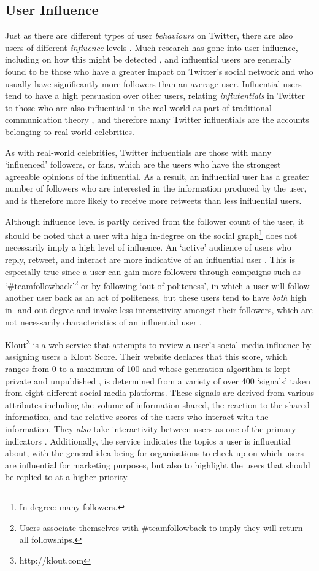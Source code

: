 \subsection{User Influence}
Just as there are different types of user \textit{behaviours} on Twitter, there are also users of different \textit{influence} levels \cite{quercia11}. Much research has gone into user influence, including on how this might be detected \cite{yu11}, and influential users are generally found to be those who have a greater impact on Twitter's social network \cite{bakshy11} and who usually have significantly more followers than an average user. Influential users tend to have a high persuasion over other users, relating \textit{influtentials} in Twitter to those who are also influential in the real world as part of traditional communication theory \cite{cha10}, and therefore many Twitter influentials are the accounts belonging to real-world celebrities.

As with real-world celebrities, Twitter influentials are those with many `influenced' followers, or fans, which are the users who have the strongest agreeable opinions of the influential. As a result, an influential user has a greater number of followers who are interested in the information produced by the user, and is therefore more likely to receive more retweets than less influential users.

Although influence level is partly derived from the follower count of the user, it should be noted that a user with high in-degree on the social graph\footnote{In-degree: many followers.} does not necessarily imply a high level of influence. An `active' audience of users who reply, retweet, and interact are more indicative of an influential user \cite{bigonha10}. This is especially true since a user can gain more followers through campaigns such as `\#teamfollowback'\footnote{Users associate themselves with \#teamfollowback to imply they will return all followships.} or by following `out of politeness', in which a user will follow another user back as an act of politeness, but these users tend to have \textit{both} high in- and out-degree and invoke less interactivity amongst their followers, which are not necessarily characteristics of an influential user \cite{cha10}.

Klout\footnote{http://klout.com} is a web service that attempts to review a user's social media influence by assigning users a Klout Score. Their website declares that this score, which ranges from 0 to a maximum of 100 and whose generation algorithm is kept private and unpublished \cite{edwards13}, is determined from a variety of over 400 `signals' taken from eight different social media platforms. These signals are derived from various attributes including the volume of information shared, the reaction to the shared information, and the relative scores of the users who interact with the information. They \textit{also} take interactivity between users as one of the primary indicators \cite{anger11}. Additionally, the service indicates the topics a user is influential about, with the general idea being for organisations to check up on which users are influential for marketing purposes, but also to highlight the users that should be replied-to at a higher priority.


